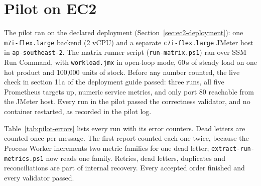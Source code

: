 \documentclass[a4paper]{report}
\begin{document}
\section{Pilot on EC2}
\label{sec:pilot}

The pilot ran on the declared deployment (Section~\ref{sec:ec2-deployment}): one
\texttt{m7i-flex.large} backend (2 vCPU) and a separate \texttt{c7i-flex.large}
JMeter host in \texttt{ap-southeast-2}. The matrix runner script
(\texttt{run-matrix.ps1}) ran over SSM Run Command, with \texttt{workload.jmx}
in open-loop mode, 60\,s of steady load on one hot product and 100,000 units of
stock. Before any number counted, the live check in section 11a of the
deployment guide passed: three runs,
all five Prometheus targets up, numeric service metrics, and only port 80
reachable from the JMeter host. Every run in the pilot passed the correctness
validator, and no container restarted, as recorded in the pilot log.

Table~\ref{tab:pilot-errors} lists every run with its error counters. Dead
letters are counted once per message. The first report counted each one twice,
because the Process Worker increments two metric families for one dead letter;
\texttt{extract-run-metrics.ps1} now reads one family.
Retries, dead letters, duplicates and reconciliations are part of internal
recovery. Every accepted order finished and every validator passed.
\end{document}
